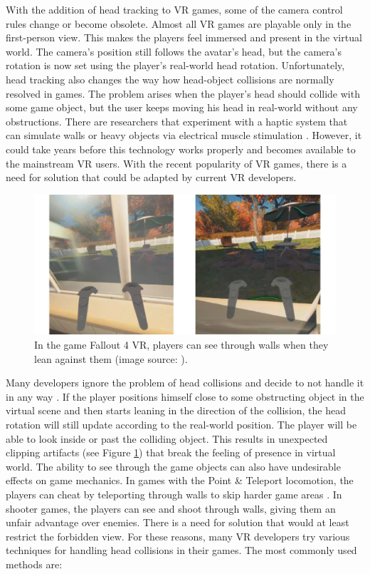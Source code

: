 With the addition of head tracking to VR games, some of the camera control rules change or become obsolete. Almost all VR games are playable only in the first-person view. This makes the players feel immersed and present in the virtual world. The camera's position still follows the avatar's head, but the camera's rotation is now set using the player’s real-world head rotation. Unfortunately, head tracking also changes the way how head-object collisions are normally resolved in games. The problem arises when the player's head should collide with some game object, but the user keeps moving his head in real-world without any obstructions. There are researchers that experiment with a haptic system that can simulate walls or heavy objects via electrical muscle stimulation \cite{HEPTICSYSTEM}. However, it could take years before this technology works properly and becomes available to the mainstream VR users. With the recent popularity of VR games, there is a need for solution that could be adapted by current VR developers.

\begin{figure}[th]
\centering
\includegraphics[width=1\textwidth]{img/clipping.png}
\caption{In the game Fallout 4 VR, players can see through walls when they lean against them (image source: \cite{redditfallout}).}
\label{fig:FALLOUTCLIPPING}
\end{figure}

Many developers ignore the problem of head collisions and decide to not handle it in any way \cite{OCULUSDOCCLIPPING}. If the player positions himself close to some obstructing object in the virtual scene and then starts leaning in the direction of the collision, the head rotation will still update according to the real-world position. The player will be able to look inside or past the colliding object. This results in unexpected clipping artifacts (see Figure \ref{fig:FALLOUTCLIPPING}) that break the feeling of presence in virtual world. The ability to see through the game objects can also have undesirable effects on game mechanics. In games with the Point \& Teleport locomotion, the players can cheat by teleporting through walls to skip harder game areas \cite{SKYRIMTELEPORT}. In shooter games, the players can see and shoot through walls, giving them an unfair advantage over enemies. There is a need for solution that would at least restrict the forbidden view. For these reasons, many VR developers try various techniques for handling head collisions in their games. The most commonly used methods are:

